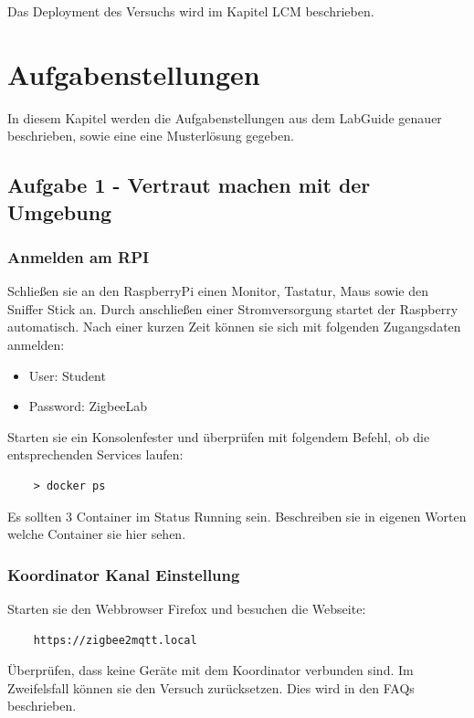 Das Deployment des
Versuchs wird im Kapitel LCM beschrieben.

\section{Aufgabenstellungen}

In diesem Kapitel werden die Aufgabenstellungen aus dem LabGuide genauer beschrieben, sowie eine eine Musterlösung gegeben.


\subsection{Aufgabe 1 - Vertraut machen mit der Umgebung}

\subsubsection{Anmelden am RPI}
Schließen sie an den RaspberryPi einen Monitor, Tastatur, Maus sowie den Sniffer Stick an. Durch anschließen einer
Stromversorgung startet der Raspberry automatisch. Nach einer kurzen Zeit können sie sich mit folgenden Zugangsdaten 
anmelden:

\begin{itemize}
    \item User: Student 
    \item Password: ZigbeeLab
\end{itemize}


Starten sie ein Konsolenfester und überprüfen mit folgendem Befehl, ob die entsprechenden Services laufen:
\begin{lstlisting}
    > docker ps
\end{lstlisting}

Es sollten 3 Container im Status \grqq Running\grqq{} sein. Beschreiben sie in eigenen Worten welche Container sie hier sehen.

\subsubsection{Koordinator Kanal Einstellung}
Starten sie den Webbrowser Firefox und besuchen die Webseite:
\begin{lstlisting}
    https://zigbee2mqtt.local
\end{lstlisting}

Überprüfen, dass keine Geräte mit dem Koordinator verbunden sind. Im Zweifelsfall können sie den Versuch zurücksetzen.
Dies wird in den FAQs beschrieben.

